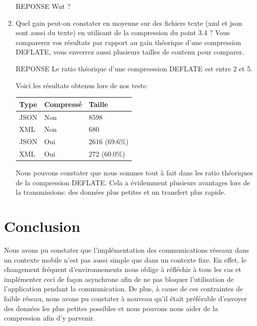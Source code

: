 \documentclass[a4paper]{article}
\begin{document}
\begin{enumerate}
    REPONSE
    Wut ?
    
    \item Quel gain peut-on constater en moyenne sur des fichiers texte (xml et json sont aussi du texte) en utilisant de la compression du point 3.4 ? Vous comparerez vos résultats par rapport au gain théorique d’une compression DEFLATE, vous enverrez aussi plusieurs tailles de contenu pour comparer.
    
    REPONSE
    Le ratio théorique d'une compresssion DEFLATE est entre 2 et 5.
    
    Voici les résultats obtenus lors de nos tests:
    \\
    \begin{center}
        \begin{tabular}{|l|l|l|}
            \hline
            \textbf{Type} & \textbf{Compressé} & \textbf{Taille}
            \\
            \hline
            JSON & Non & 8598
            \\
            \hline
            XML & Non & 680
            \\
            \hline
            JSON & Oui & 2616 (69.6\%)
            \\
            \hline
            XML & Oui & 272 (60.0\%)
            \\
            \hline
        \end{tabular}
    \end{center}
    
    Nous pouvons constater que nous sommes tout à fait dans les ratio théoriques de la compression DEFLATE. Cela a évidemment plusieurs avantages lors de la transmissions: des données plus petites et un transfert plus rapide.
    
\end{enumerate}

\section{Conclusion}

Nous avons pu constater que l'implémentation des communications réseaux dans un contexte mobile n'est pas aussi simple que dans un contexte fixe. En effet, le changement fréquent d'environnements nous oblige à réfléchir à tous les cas et implémenter ceci de façon asynchrone afin de ne pas bloquer l'utilisation de l'application pendant la communication. De plus, à cause de ces contraintes de faible réseau, nous avons pu constater à nouveau qu'il était préférable d'envoyer des données les plus petites possibles et nous pouvons nous aider de la compression afin d'y parvenir.
\end{document}
